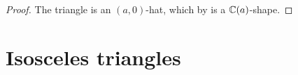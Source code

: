 \begin{proof}
    The triangle is an $(a,0)$-hat, which by  is a $\mathbb{C}(a)$-shape.
\end{proof}

\section{Isosceles triangles}

%
%
%
%
%
%
%
%

%
%

